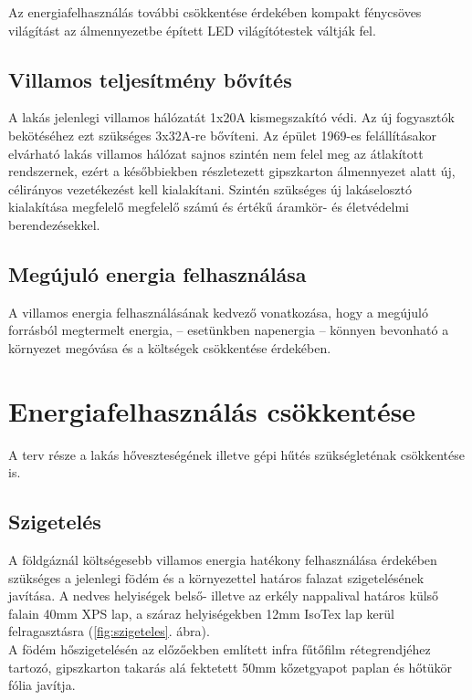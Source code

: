 Az energiafelhasználás további csökkentése érdekében kompakt fénycsöves világítást az álmennyezetbe 
épített LED világítótestek váltják fel.

\subsection{Villamos teljesítmény bővítés}
A lakás jelenlegi villamos hálózatát 1x20A kismegszakító védi.
Az új fogyasztók bekötéséhez ezt szükséges 3x32A-re bővíteni.
Az épület 1969-es felállításakor elvárható lakás villamos hálózat sajnos szintén nem felel meg az átlakított 
rendszernek, ezért a későbbiekben részletezett gipszkarton álmennyezet alatt új, célirányos
vezetékezést kell kialakítani. Szintén szükséges új lakáselosztó kialakítása
megfelelő megfelelő számú és értékű áramkör- és életvédelmi berendezésekkel.

\subsection{Megújuló energia felhasználása}
\label{sec:napelem}
A villamos energia felhasználásának kedvező vonatkozása, hogy a megújuló forrásból megtermelt 
energia, -- esetünkben napenergia -- könnyen bevonható a környezet megóvása és a költségek csökkentése 
érdekében.

\section{Energiafelhasználás csökkentése}
\label{sec:hoatbocsatas}
A terv része a lakás hőveszteségének illetve gépi hűtés szükségleténak csökkentése is.

\subsection{Szigetelés}
\label{sec:burkolat}
A földgáznál költségesebb villamos energia hatékony felhasználása érdekében szükséges a jelenlegi födém és
a környezettel határos falazat szigetelésének javítása. A nedves helyiségek belső- illetve az erkély nappalival 
határos külső falain 40mm XPS lap, a száraz helyiségekben 12mm IsoTex lap kerül felragasztásra (\ref{fig:szigeteles}. ábra). \\

A födém hőszigetelésén az előzőekben említett infra fűtőfilm rétegrendjéhez tartozó, gipszkarton takarás alá
fektetett 50mm kőzetgyapot paplan és hőtükör fólia javítja.

